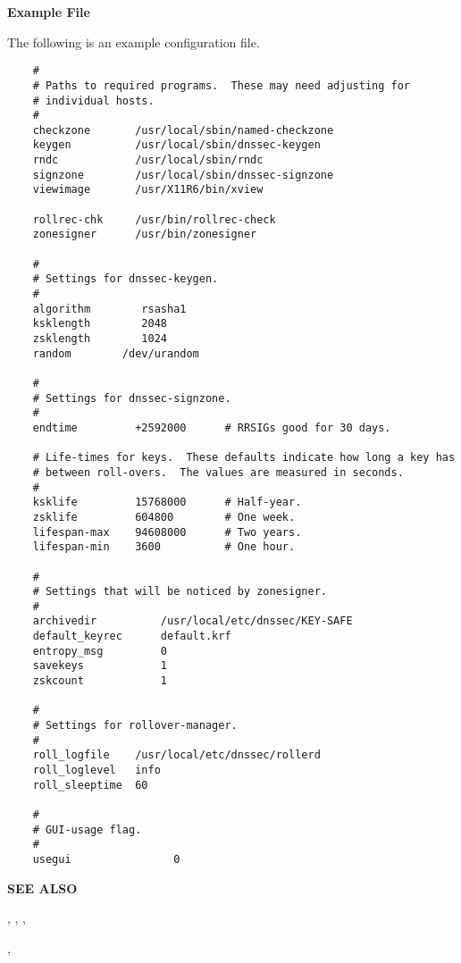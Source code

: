 {\bf Example File}

The following is an example  configuration file.

\begin{verbatim}
    #
    # Paths to required programs.  These may need adjusting for
    # individual hosts.
    #
    checkzone       /usr/local/sbin/named-checkzone
    keygen          /usr/local/sbin/dnssec-keygen
    rndc            /usr/local/sbin/rndc
    signzone        /usr/local/sbin/dnssec-signzone
    viewimage       /usr/X11R6/bin/xview

    rollrec-chk     /usr/bin/rollrec-check
    zonesigner      /usr/bin/zonesigner

    #
    # Settings for dnssec-keygen.
    #
    algorithm        rsasha1
    ksklength        2048
    zsklength        1024
    random        /dev/urandom
    
    #
    # Settings for dnssec-signzone.
    #
    endtime         +2592000      # RRSIGs good for 30 days.
    
    # Life-times for keys.  These defaults indicate how long a key has
    # between roll-overs.  The values are measured in seconds.
    # 
    ksklife         15768000      # Half-year.
    zsklife         604800        # One week.
    lifespan-max    94608000      # Two years.
    lifespan-min    3600          # One hour.

    #
    # Settings that will be noticed by zonesigner.
    #
    archivedir          /usr/local/etc/dnssec/KEY-SAFE
    default_keyrec      default.krf
    entropy_msg         0
    savekeys            1
    zskcount            1

    #
    # Settings for rollover-manager.
    #
    roll_logfile    /usr/local/etc/dnssec/rollerd
    roll_loglevel   info
    roll_sleeptime  60

    #
    # GUI-usage flag.
    #
    usegui                0
\end{verbatim}

{\bf SEE ALSO}

,
,
,

,

